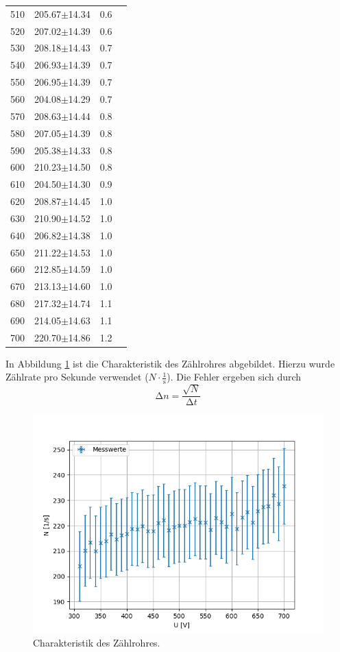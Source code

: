 \begin{table} [H]
\begin{tabular}{S[table-format=4.2]ccc}
		510 &205.67$\pm$14.34& 0.6\\
		520 &207.02$\pm$14.39& 0.6\\
		530 &208.18$\pm$14.43& 0.7\\
		540 &206.93$\pm$14.39& 0.7\\
		550 &206.95$\pm$14.39& 0.7\\
		560 &204.08$\pm$14.29& 0.7\\
		570 &208.63$\pm$14.44& 0.8\\
		580 &207.05$\pm$14.39& 0.8\\
		590 &205.38$\pm$14.33& 0.8\\
		600 &210.23$\pm$14.50& 0.8\\
		610 &204.50$\pm$14.30& 0.9\\
		620 &208.87$\pm$14.45& 1.0\\
		630 &210.90$\pm$14.52& 1.0\\
		640 &206.82$\pm$14.38& 1.0\\
		650 &211.22$\pm$14.53& 1.0\\
		660 &212.85$\pm$14.59& 1.0\\
		670 &213.13$\pm$14.60& 1.0\\
		680 &217.32$\pm$14.74& 1.1\\
		690 &214.05$\pm$14.63& 1.1\\
		700 &220.70$\pm$14.86& 1.2\\
		\bottomrule 
	\end{tabular}
\end{table} 

In Abbildung \ref{fig:Charakteristik} ist die Charakteristik des Zählrohres abgebildet. Hierzu wurde Zählrate pro Sekunde verwendet ($N \cdot \frac{1}{\text{s}}$). Die Fehler ergeben sich durch
\begin{equation*}
	\increment n = \frac{\sqrt{N}}{\increment t}
\end{equation*}

\begin{figure}[H]
    \centering
    \includegraphics[scale=0.7]{Auswertung/Charakteristik.pdf}
    \caption{Charakteristik des Zählrohres.}
    \label{fig:Charakteristik}
\end{figure}

